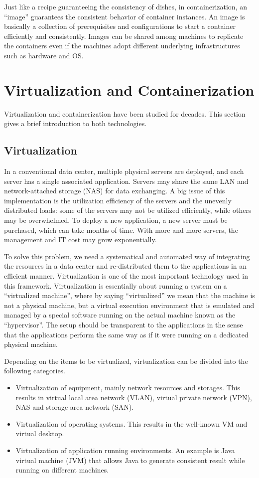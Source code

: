 Just like a recipe guaranteeing the consistency of dishes, in containerization, an ``image'' guarantees the consistent behavior of container instances. An image is basically a collection of prerequisites and configurations to start a container efficiently and consistently. Images can be shared among machines to replicate the containers even if the machines adopt different underlying infrastructures such as hardware and OS.

\section{Virtualization and Containerization}

Virtualization and containerization have been studied for decades. This section gives a brief introduction to both technologies.

\subsection{Virtualization}

In a conventional data center, multiple physical servers are deployed, and each server has a single associated application. Servers may share the same LAN and network-attached storage (NAS) for data exchanging. A big issue of this implementation is the utilization efficiency of the servers and the unevenly distributed loads: some of the servers may not be utilized efficiently, while others may be overwhelmed. To deploy a new application, a new server must be purchased, which can take months of time. With more and more servers, the management and IT cost may grow exponentially.

To solve this problem, we need a systematical and automated way of integrating the resources in a data center and re-distributed them to the applications in an efficient manner. Virtualization is one of the most important technology used in this framework. Virtualization is essentially about running a system on a ``virtualized machine'', where by saying ``virtualized'' we mean that the machine is not a physical machine, but a virtual execution environment that is emulated and managed by a special software running on the actual machine known as the ``hypervisor''. The setup should be transparent to the applications in the sense that the applications perform the same way as if it were running on a dedicated physical machine.

Depending on the items to be virtualized, virtualization can be divided into the following categories.
\begin{itemize}
  \item Virtualization of equipment, mainly network resources and storages. This results in virtual local area network (VLAN), virtual private network (VPN), NAS and storage area network (SAN).
  \item Virtualization of operating systems. This results in the well-known VM and virtual desktop.
  \item Virtualization of application running environments. An example is Java virtual machine (JVM) that allows Java to generate consistent result while running on different machines.
\end{itemize}

